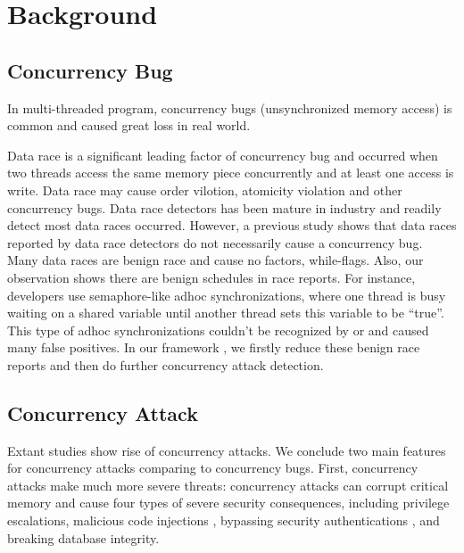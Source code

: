 \section{Background}\label{sec:background}

\subsection{Concurrency Bug}

In multi-threaded program, concurrency bugs (unsynchronized memory access) is common and caused great loss in real world\cite{nasdaq, therac}.  

Data race is a significant leading factor of concurrency bug and occurred when two threads 
access the same memory piece concurrently and at least one access is write\cite{datacollider:osdi10,savage:eraser, yu:racetrack:sosp}. 
Data race may cause order vilotion, atomicity violation and other concurrency bugs.
Data race detectors has been mature in industry\cite{tsan,valgrind:pldi} and 
readily detect most data races occurred.
However, a previous study \cite{lu:concurrency-bugs} shows that 
data races reported by data race detectors do not necessarily cause a concurrency bug. 
Many data races are benign race and cause no factors, \eg while-flags.
Also, our observation shows there are benign schedules in race reports.
For instance,
developers use semaphore-like adhoc synchronizations,
where one thread is busy waiting on a shared variable until
another thread sets this variable to be ``true''. This type of adhoc
synchronizations couldn’t be recognized by \tsan or \ski
and caused many false positives.
In our framework \xxx, we firstly reduce these benign race reports and then do further concurrency attack detection.

 
\subsection{Concurrency Attack}

Extant studies \cite{con:hotpar12, acidrain:sigmod17} show rise of concurrency 
attacks. We conclude two main features for concurrency attacks comparing to concurrency bugs. 
First, concurrency attacks make much more severe threats:
concurrency attacks can corrupt critical memory and cause four
types of severe security consequences, including privilege escalations\cite{uselib-bug-12791, mysql-bug-24988},
malicious code injections \cite{msiexploit},  
bypassing security authentications\cite{cve-2010-0923, cve-2008-0034, cve-2010-1754}
, and breaking database integrity\cite{acidrain:sigmod17}. 

